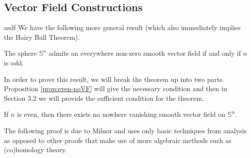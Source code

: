 \subsection{Vector Field Constructions}
asdf
We have the following more general result (which also immediately implies the Hairy Ball Theorem).
\begin{theorem}
\label{thm:novan-iff-odd}
The sphere $\mathbb{S}^n$ admits an everywhere non-zero smooth vector field if and only if $n$ is odd.
\end{theorem}
In order to prove this result, we will break the theorem up into two parts. Proposition \ref{prop:even-noVF} will give the necessary condition and then in Section 3.2 we will provide the sufficient condition for the theorem.
\begin{proposition}
\label{prop:even-noVF}
If $n$ is even, then there exists no nowhere vanishing smooth vector field on $\mathbb{S}^n$.
\end{proposition}
The following proof is due to Milnor \cite{MR505523} and uses only basic techniques from analysis as opposed to other proofs that make use of more algebraic methods such as (co)homology theory.
